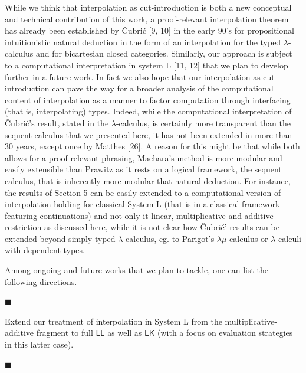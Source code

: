 While we think that interpolation as cut-introduction is both a new conceptual and technical contribution of this work, a proof-relevant interpolation theorem has already been established by Čubrić [9, 10] in the early 90’s for propositional intuitionistic natural deduction in the form of an interpolation for the typed $\lambda$-calculus and for bicartesian closed categories. Similarly, our approach is subject to a computational interpretation in system L [11, 12] that we plan to develop further in a future work. In fact we also hope that our interpolation-as-cut-introduction can pave the way for a broader analysis of the computational content of interpolation as a manner to factor computation through interfacing (that is, interpolating) types. Indeed, while the computational interpretation of Čubrić’s result, stated in the $\lambda$-calculus, is certainly more transparent than the sequent calculus that we presented here, it has not been extended in more than 30 years, except once by Matthes [26]. A reason for this might be that while both allows for a proof-relevant phrasing, Maehara’s method is more modular and easily extensible than Prawitz as it rests on a logical framework, the sequent calculus, that is inherently more modular that natural deduction. For instance, the results of Section 5 can be easily extended to a computational version of interpolation holding for classical System L (that is in a classical framework featuring continuations) and not only it linear, multiplicative and additive restriction as discussed here, while it is not clear how Čubrić’ results can be extended beyond simply typed $\lambda$-calculus, eg. to Parigot’s $\lambda\mu$-calculus or $\lambda$-calculi with dependent types.\par
 
 
 
Among ongoing and future works that we plan to tackle, one can list the following directions.\par
  
\par\noindent  $\blacksquare$ 
 
Extend our treatment of interpolation in System L from the multiplicative-additive fragment to full $\mathsf{LL}$ as well as $\mathsf{LK}$ (with a focus on evaluation strategies in this latter case).\par
 
 
 
\par\noindent  $\blacksquare$ 
 
